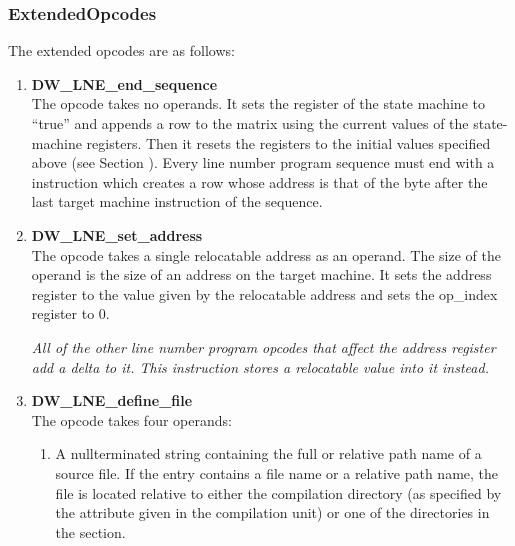 \subsubsection{ExtendedOpcodes}
\label{chap:extendedopcodes}

The extended opcodes are as follows:

\begin{enumerate}[1.]

\item \textbf{DW\-\_LNE\-\_end\-\_sequence} \\
The  opcode takes no operands. It sets the
register of the state machine to “true” and
appends a row to the matrix using the current values of the
state-machine registers. Then it resets the registers to the
initial values specified above 
(see Section ). 
Every line
number program sequence must end with a 
instruction which creates a row whose address is that of the
byte after the last target machine instruction of the sequence.

\item \textbf{DW\-\_LNE\-\_set\-\_address} \\
The  opcode takes a single relocatable
address as an operand. The size of the operand is the size
of an address on the target machine. It sets the address
register to the value given by the relocatable address and
sets the op\_index register to 0.

\textit{All of the other line number program opcodes that
affect the address register add a delta to it. This instruction
stores a relocatable value into it instead.}


\item \textbf{DW\-\_LNE\-\_define\-\_file} \\

The  opcode takes four operands:

\begin{enumerate}[1.]

\item A null\dash terminated string containing the full or relative
path name of a source file. If the entry contains a file
name or a relative path name, the file is located relative
to either the compilation directory (as specified by the
 attribute given in the compilation unit)
or one of the directories in the 
 section.


\end{enumerate}
\end{enumerate}
